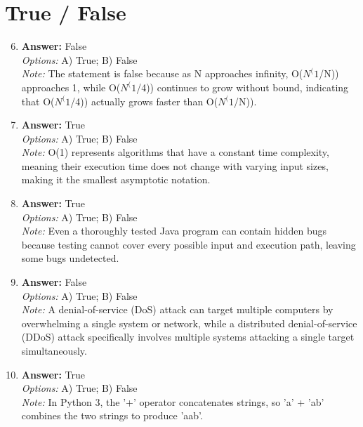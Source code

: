 \documentclass[12pt]{article}
\begin{document}
\section*{True / False}
\begin{enumerate}[label=\arabic*.]
\setcounter{enumi}{5}
\item \textbf{Answer:} False
\\ \textit{Options:} A) True; B) False
\\ \textit{Note:} The statement is false because as N approaches infinity, O($N^(1$/N)) approaches 1, while O($N^(1$/4)) continues to grow without bound, indicating that O($N^(1$/4)) actually grows faster than O($N^(1$/N)).
\item \textbf{Answer:} True
\\ \textit{Options:} A) True; B) False
\\ \textit{Note:} O(1) represents algorithms that have a constant time complexity, meaning their execution time does not change with varying input sizes, making it the smallest asymptotic notation.
\item \textbf{Answer:} True
\\ \textit{Options:} A) True; B) False
\\ \textit{Note:} Even a thoroughly tested Java program can contain hidden bugs because testing cannot cover every possible input and execution path, leaving some bugs undetected.
\item \textbf{Answer:} False
\\ \textit{Options:} A) True; B) False
\\ \textit{Note:} A denial-of-service (DoS) attack can target multiple computers by overwhelming a single system or network, while a distributed denial-of-service (DDoS) attack specifically involves multiple systems attacking a single target simultaneously.
\item \textbf{Answer:} True
\\ \textit{Options:} A) True; B) False
\\ \textit{Note:} In Python 3, the '+' operator concatenates strings, so 'a' + 'ab' combines the two strings to produce 'aab'.
\end{enumerate}
\end{document}
